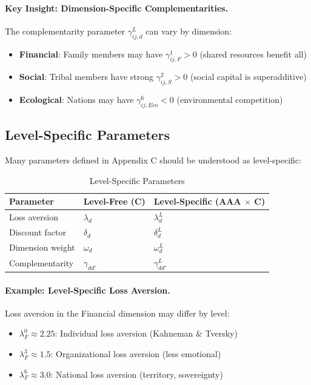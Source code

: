 \paragraph{Key Insight: Dimension-Specific Complementarities.}

The complementarity parameter $\gamma^L_{ij,d}$ can vary by dimension:

\begin{itemize}[nosep]
\item \textbf{Financial}: Family members may have $\gamma^1_{ij,F} > 0$ (shared resources benefit all)
\item \textbf{Social}: Tribal members have strong $\gamma^2_{ij,S} > 0$ (social capital is superadditive)
\item \textbf{Ecological}: Nations may have $\gamma^6_{ij,Eco} < 0$ (environmental competition)
\end{itemize}

\subsection{Level-Specific Parameters}

Many parameters defined in Appendix C should be understood as level-specific:

\begin{table}[htbp]
\centering
\caption{Level-Specific Parameters}
\label{tab:app-c-level-params}
\renewcommand{\arraystretch}{1.3}
\begin{tabular}{@{}lll@{}}
\toprule
\textbf{Parameter} & \textbf{Level-Free (C)} & \textbf{Level-Specific (AAA $\times$ C)} \\
\midrule
Loss aversion & $\lambda_d$ & $\lambda^L_d$ \\
Discount factor & $\delta_d$ & $\delta^L_d$ \\
Dimension weight & $\omega_d$ & $\omega^L_d$ \\
Complementarity & $\gamma_{dd'}$ & $\gamma^L_{dd'}$ \\
\bottomrule
\end{tabular}
\end{table}

\paragraph{Example: Level-Specific Loss Aversion.}

Loss aversion in the Financial dimension may differ by level:

\begin{itemize}[nosep]
\item $\lambda^0_F \approx 2.25$: Individual loss aversion (Kahneman \& Tversky)
\item $\lambda^3_F \approx 1.5$: Organizational loss aversion (less emotional)
\item $\lambda^6_F \approx 3.0$: National loss aversion (territory, sovereignty)
\end{itemize}

